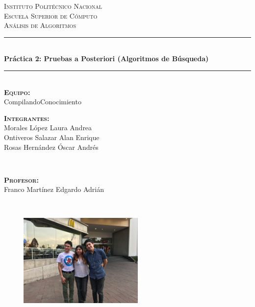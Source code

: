 \documentclass[12pt, fleqn]{article}                             %
\author{Oscar Andrés Rosas}                                     %
\theoremstyle{break}                                            %
\begin{document}
\begin{titlepage}

    \center
    \textsc{\Large Instituto Politécnico Nacional \\ Escuela Superior de Cómputo}\\[0.5cm] 
    \textsc{\large Análisis de Algoritmos}\\[1.5cm]

    \rule{\linewidth}{0.5mm} \\[1.0cm]
        { \huge \bfseries Práctica 2: Pruebas a Posteriori (Algoritmos de Búsqueda)}\\[1.0cm] 
    \rule{\linewidth}{0.5mm} \\[1.5cm]
     
    \textbf{\textsc{Equipo:}}       \\
    CompilandoConocimiento          \\[1cm]

    \begin{minipage}{0.4\textwidth}
        \begin{flushleft} \large

            \textbf{\textsc{Integrantes:}}      \\
            \small{
                Morales López Laura Andrea      \\
                Ontiveros Salazar Alan Enrique  \\
                Rosas Hernández Óscar Andrés
            }
        \end{flushleft}
    \end{minipage}
    ~
    \begin{minipage}{0.4\textwidth}
        \begin{flushright} \large
            \textbf{\textsc{Profesor: }}\\
            Franco Martínez Edgardo Adrián
        \end{flushright}
    \end{minipage}\\[1.5cm]

    \begin{figure}[h]
        \centering
        \includegraphics[width=0.55\textwidth]{Foto}
    \end{figure}

    \vfill

\end{titlepage}
\end{document}
